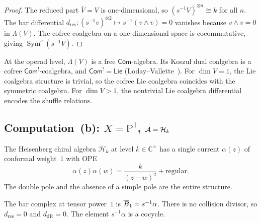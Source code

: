 \begin{proof}
The reduced part $\bar{V} = V$ is one-dimensional, so
$(s^{-1}V)^{\otimes n} \cong k$ for all $n$.  The bar differential
$d_{\mathrm{res}}\colon (s^{-1}v)^{\otimes 2} \mapsto
s^{-1}(v \wedge v) = 0$
vanishes because $v \wedge v = 0$ in $\Lambda(V)$.  The cofree
coalgebra on a one-dimensional space is cocommutative, giving
$\operatorname{Sym}^c(s^{-1}V)$.
\end{proof}

\begin{remark}\label{rem:fourier-com-lie-operad}
At the operad level, $\Lambda(V)$ is a free $\mathsf{Com}$-algebra.
Its Koszul dual coalgebra is a cofree $\mathsf{Com}^!$-coalgebra, and
$\mathsf{Com}^! = \mathsf{Lie}$
(Loday--Vallette~\cite[Theorem~7.2.2]{LV12}).  For $\dim V = 1$,
the Lie coalgebra structure is trivial, so the cofree Lie coalgebra
coincides with the symmetric coalgebra.  For $\dim V > 1$, the
nontrivial Lie coalgebra differential encodes the shuffle relations.
\end{remark}

\subsection*{Computation~(b): $X = \mathbb{P}^1$,
  $\mathcal{A} = \mathcal{H}_k$}

The Heisenberg chiral algebra $\mathcal{H}_k$ at level
$k \in \mathbb{C}^\times$ has a single current $\alpha(z)$ of
conformal weight~$1$ with OPE
\begin{equation}\label{eq:fourier-heisenberg-ope}
\alpha(z)\alpha(w) = \frac{k}{(z-w)^2} + \text{regular}.
\end{equation}
The double pole and the absence of a simple pole are the entire
structure.

\begin{computation}[\texorpdfstring{$n = 1$}{n = 1}]\label{comp:fourier-heisenberg-n1}
The bar complex at tensor power~$1$ is $\overline{B}_1 = s^{-1}\alpha$.
There is no collision divisor, so
$d_{\mathrm{res}} = 0$ and $d_{\mathrm{dR}} = 0$.  The element
$s^{-1}\alpha$ is a cocycle.
\end{computation}

